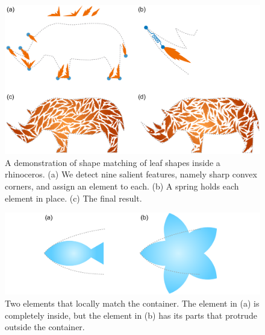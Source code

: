 \begin{figure}[t]
\centering
\includegraphics[width=1.0\textwidth]{figures/repulsionpak/rhino_shape_matching_bitmap_2.pdf} 
\caption[A demonstration of shape matching to place elements]
{\label{rhino_packing}
{ 
A demonstration of shape matching of leaf shapes inside a rhinoceros. 
(a) We detect nine salient features, namely sharp convex corners, and 
assign an element to each.
(b) A spring holds each element in place.
(c) The final result.
}
}
\end{figure}

\begin{figure}%
\centering
\includegraphics[width=1.0\textwidth]{figures/repulsionpak/shape_matching_score.pdf}
\caption[Global and local shape matching]{
  \label{fig_global_local}
  \nnewtext
  {
  Two elements that locally match the container. 
  The element in (a) is completely inside, but the element in (b) has its parts that
  protrude outside the container.
  }
}
\end{figure}

